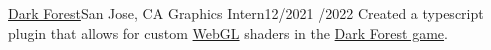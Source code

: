 \resumeSubheading
{\href{https://zkga.me}{Dark Forest}}{San Jose, CA}
{Graphics Intern}{12/2021 /2022}
\resumeItemListStart
{}
{Created a typescript plugin that allows for custom \href{https://developer.mozilla.org/en-US/docs/Web/API/WebGL_API}{WebGL} shaders in the \href{https://zkga.me/}{Dark Forest game}.}
\resumeItemListEnd
